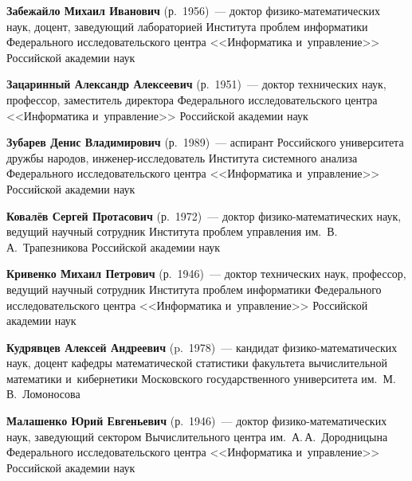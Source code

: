 \begin{multicols}{2}
\vspace*{3pt}

\noindent
\textbf{Забежайло Михаил Иванович} (р.\ 1956)~--- 
доктор фи\-зи\-ко-ма\-те\-ма\-ти\-че\-ских наук, 
доцент, заведующий лабора\-то\-ри\-ей Института проб\-лем информатики 
Федерального исследовательского центра <<Информатика и~управ\-ле\-ние>>
 Российской академии наук

\vspace*{3pt}

\noindent
\textbf{Зацаринный Александр Алексеевич} (р.\ 1951)~--- доктор технических наук, 
профессор, заместитель директора Федерального исследовательского центра 
<<Информатика и~управ\-ле\-ние>> Российской академии наук

\vspace*{3pt}

\noindent
\textbf{Зубарев Денис Владимирович} (р.\ 1989)~---  аспирант Российского 
университета дружбы народов, ин\-же\-нер-ис\-сле\-до\-ва\-тель Института 
системного анализа Федерального исследовательского центра <<Информатика и~управ\-ле\-ние>> 
Российской академии наук

\vspace*{3pt}

\noindent
\textbf{Ковалёв Сергей Протасович} (р.\ 1972)~--- доктор фи\-зи\-ко-ма\-те\-ма\-ти\-че\-ских наук, 
ведущий научный сотрудник Института проб\-лем управления им.\ В.\,А.~Трапезникова 
Российской академии наук

\vspace*{3pt}

\noindent
\textbf{Кривенко Михаил Петрович} (р.\ 1946)~--- доктор техниче\-ских наук, профессор,
 ведущий научный сотрудник Института проб\-лем информатики 
 Федерального исследовательского центра <<Информатика и~управ\-ле\-ние>>
  Российской академии наук

\vspace*{3pt}

\noindent
\textbf{Кудрявцев Алексей Андреевич} (p.\ 1978)~--- 
кандидат фи\-зи\-ко-ма\-те\-ма\-ти\-че\-ских наук, 
доцент кафедры математической статистики факультета вычислительной математики 
и~кибернетики Московского государственного университета им.\ М.\,В.~Ломоносова

\vspace*{3pt}

\noindent
\textbf{Малашенко Юрий Евгеньевич} (р.\ 1946)~--- 
доктор фи\-зи\-ко-ма\-те\-ма\-ти\-че\-ских наук, за\-ве\-ду\-ющий 
сектором Вычислительного центра им.\ А.\,А.~Дородницына 
Федерального исследовательского центра <<Информатика и~управ\-ле\-ние>> 
Российской академии наук


\end{multicols}
